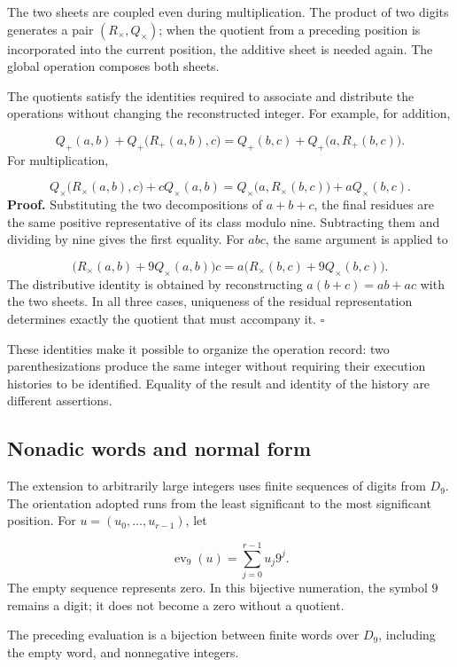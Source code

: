 The two sheets are coupled even during multiplication. The product of two digits generates a pair $(R_\times,Q_\times)$; when the quotient from a preceding position is incorporated into the current position, the additive sheet is needed again. The global operation composes both sheets.

The quotients satisfy the identities required to associate and distribute the operations without changing the reconstructed integer. For example, for addition,

\[
Q_+(a,b)+Q_+\bigl(R_+(a,b),c\bigr)
=Q_+(b,c)+Q_+\bigl(a,R_+(b,c)\bigr).
\]
For multiplication,

\[
Q_\times\bigl(R_\times(a,b),c\bigr)+cQ_\times(a,b)
=Q_\times\bigl(a,R_\times(b,c)\bigr)+aQ_\times(b,c).
\]
\textbf{Proof.} Substituting the two decompositions of $a+b+c$, the final residues are the same positive representative of its class modulo nine. Subtracting them and dividing by nine gives the first equality. For $abc$, the same argument is applied to

\[
\bigl(R_\times(a,b)+9Q_\times(a,b)\bigr)c
=a\bigl(R_\times(b,c)+9Q_\times(b,c)\bigr).
\]
The distributive identity is obtained by reconstructing $a(b+c)=ab+ac$ with the two sheets. In all three cases, uniqueness of the residual representation determines exactly the quotient that must accompany it. \hfill\(\square\)

These identities make it possible to organize the operation record: two parenthesizations produce the same integer without requiring their execution histories to be identified. Equality of the result and identity of the history are different assertions.

\subsection{Nonadic words and normal form}
The extension to arbitrarily large integers uses finite sequences of digits from $D_9$. The orientation adopted runs from the least significant to the most significant position. For $u=(u_0,\ldots,u_{r-1})$, let

\[
\operatorname{ev}_9(u)=\sum_{j=0}^{r-1}u_j9^j.
\]
The empty sequence represents zero. In this bijective numeration, the symbol $9$ remains a digit; it does not become a zero without a quotient.

The preceding evaluation is a bijection between finite words over $D_9$, including the empty word, and nonnegative integers.


